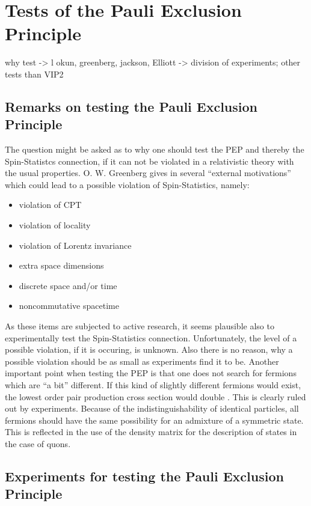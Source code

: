 \section{Tests of the Pauli Exclusion Principle}

why test -> l okun, greenberg, jackson, 
Elliott -> division of experiments; other tests than VIP2

\subsection{Remarks on testing the Pauli Exclusion Principle}

The question might be asked as to why one should test the PEP and thereby the Spin-Statistcs connection, if it can not be violated in a relativistic theory with the usual properties. O. W. Greenberg gives in \cite{Greenberg2000} several ``external motivations'' which could lead to a possible violation of Spin-Statistics, namely:
\begin{itemize}
 \item violation of CPT
 \item violation of locality
 \item violation of Lorentz invariance
 \item extra space dimensions
 \item discrete space and/or time
 \item noncommutative spacetime
\end{itemize}
As these items are subjected to active research, it seems plausible also to experimentally test the Spin-Statistics connection. Unfortunately, the level of a possible violation, if it is occuring, is unknown. Also there is no reason, why a possible violation should be as small as experiments find it to be. Another important point when testing the PEP is that one does not search for fermions which are ``a bit'' different. If this kind of slightly different fermions would exist, the lowest order pair production cross section would double \cite{Greenberg2000}. This is clearly ruled out by experiments. Because of the indistinguishability of identical particles, all fermions should have the same possibility for an admixture of a symmetric state. This is reflected in the use of the density matrix for the description of states in the case of quons.

\subsection{Experiments for testing the Pauli Exclusion Principle}

